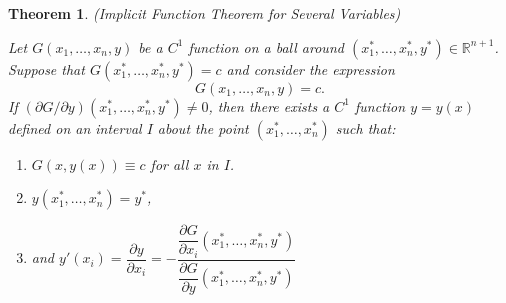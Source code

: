 \documentclass[10pt,a4paper]{book}
\newtheorem{theorem}{Theorem}[section]
\theoremstyle{definition}\newtheorem{definition}{Definition}
\theoremstyle{definition}\newtheorem{fact}{Fact}
\theoremstyle{definition}\newtheorem{ex}{Ex.}
\theoremstyle{definition}\newtheorem{project}{Project}
\theoremstyle{definition}\newtheorem{problem}{Problem}
\theoremstyle{definition}\newtheorem{example}{Example}
\numberwithin{theorem}{chapter}
\numberwithin{corollary}{chapter}
\numberwithin{assumption}{chapter}
\numberwithin{definition}{chapter}
\numberwithin{prop}{chapter}
\numberwithin{notation}{chapter}
\numberwithin{problem}{chapter}
\numberwithin{example}{chapter}
\numberwithin{fact}{chapter}
\numberwithin{ex}{chapter}
\newenvironment{ftheorem}
{\begin{mdframed}\begin{theorem}}
		{\end{theorem}\end{mdframed}}
\def\R{\mathbb R}
\def\R{\mathbb R}
\begin{document}
		\begin{ftheorem}
		\label{theo:implicit_func_several}(Implicit Function Theorem for Several Variables)
		
		Let $G(x_1, \dots, x_n ,y)$ be a $C^{1}$ function on a ball around $(x^*_1,\dots, x^*_n, y^*) \in \R^{n+1}$. Suppose that $G(x^*_1, \dots, x^*_n,y^*) = c$ and consider the expression
		\begin{equation*}
			G(x_1,\dots,x_n,y) = c.
		\end{equation*}
		If $(\partial G/\partial y)(x^*_1, \dots, x^*_n,y^*) \neq 0$, then there exists a $C^1$ function $y=y(x)$ defined on an interval $I$ about the point $(x^*_1, \dots, x^*_n)$ such that:
		\begin{enumerate}
			\item $G(x, y(x)) \equiv c$ for all $x$ in $I$.
			\item $y(x^*_1, \dots, x^*_n) = y^*$,
			\item and $y'(x_i) = \dfrac{\partial y}{\partial x_i} = - \dfrac{\dfrac{\partial G}{\partial x_i} (x^*_1, \dots, x^*_n,y^*)}{\dfrac{\partial G}{\partial y} (x^*_1, \dots, x^*_n,y^*)}$
		\end{enumerate}
	\end{ftheorem}
	
\end{document}
